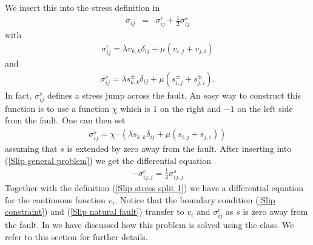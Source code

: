 We insert this into the stress definition in 
\begin{eqnarray} \label{Slip stress split}
\sigma_{ij} & = &
\sigma^c_{ij} +
\frac{1}{2} \sigma^s_{ij}
\end{eqnarray}
 with
\begin{eqnarray} \label{Slip stress split 1}
\sigma^c_{ij} = \lambda v_{k,k} \delta_{ij} + \mu ( v_{i,j} + v_{j,i})
\end{eqnarray}
and
\begin{eqnarray} \label{Slip stress split 2}
\sigma^s_{ij} = \lambda s^{\pm}_{k,k} \delta_{ij} + \mu ( s^{\pm}_{i,j} + s^{\pm}_{j,i}).
\end{eqnarray}
In fact, $\sigma^s_{ij}$ defines a stress jump across the fault.
An easy way to construct this function is to use a function $\chi$ which is
$1$ on the right and $-1$ on the left side from the fault.
One can then set
\begin{eqnarray} \label{Slip  stress split 23 }
\sigma^s_{ij} = \chi \cdot  ( \lambda s_{k,k} \delta_{ij} + \mu ( s_{i,j} + s_{j,i}) )
\end{eqnarray}
assuming that $s$ is extended by zero away from the fault.
After inserting  into (\ref{Slip general problem}) we
get the differential equation
\begin{eqnarray}\label{Slip general problem 2 }
- \sigma^c_{ij,j}=\frac{1}{2} \sigma^s_{ij,j}
\end{eqnarray}
Together with the definition (\ref{Slip stress split 1}) we have a
differential equation for the continuous function $v_i$.
Notice that the boundary condition (\ref{Slip constraint}) and (\ref{Slip natural fault})
transfer to $v_i$ and $\sigma^c_{ij}$ as $s$ is zero away from the fault.
In  we have discussed how this problem is solved using
the \LinearPDE class. We refer to this section for further details.

